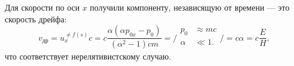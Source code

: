 Для скорости по оси $x$ получили компоненту, независящую от времени --- это скорость дрейфа:
\begin{equation*}
	v_{\text{др}} = u_x^{\neq f(s)} c  = c
	\frac{\alpha  (\alpha  p_{0x}-p_0)}{\left(\alpha ^2-1\right) c m} = 
	\bigg/
	\begin{aligned}
	    p_0 &\approx m c\\
	    \alpha &\ll 1. \\
	\end{aligned}
	\bigg/ = c \alpha = c \frac{E}{H},
\end{equation*}
что соответствует нерелятивистскому случаю.

